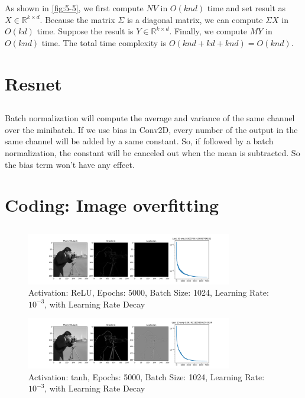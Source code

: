\documentclass[12pt]{article}
\begin{document}
As shown in \ref*{fig:5-5}, we first compute $N V$ in $O(knd)$ time and set result as $X \in \mathbb{R}^{k\times d}$. Because the matrix $\varSigma$ is a diagonal matrix, we can compute $\varSigma X$ in $O(kd)$ time. Suppose the result is $Y \in \mathbb{R}^{k\times d}$. 
Finally, we compute $M Y$ in $O(knd)$ time. The total time complexity is $O(knd + kd + knd) = O(knd)$.
\section{Resnet}
\setcounter{subsection}{1}
\subsection{}
Batch normalization will compute the average and variance of the same channel over the minibatch.
If we use bias in Conv2D, every number of the output in the same channel will be added by a same constant. So, if followed by a batch normalization, the constant will be canceled out when the mean is subtracted. So the bias term won't have any effect.

\newpage

\section{Coding: Image overfitting}
\setcounter{subsection}{4}
\subsection{}
\begin{figure}[H]
    \centering
    \includegraphics[width=0.8\textwidth]{imgs/siren_relu_e5000_b1024_lr10-3_decay.png}
    \caption{Activation: ReLU, Epochs: 5000, Batch Size: 1024, Learning Rate: $10^{-3}$, with Learning Rate Decay}
    \label{fig:5-5-relu}
\end{figure}

\begin{figure}[H]
    \centering
    \includegraphics[width=0.8\textwidth]{imgs/siren_tanh_e5000_b1024_lr10-3_decay.png}
    \caption{Activation: tanh, Epochs: 5000, Batch Size: 1024, Learning Rate: $10^{-3}$, with Learning Rate Decay}
    \label{fig:5-5-tanh}
\end{figure}
\end{document}
